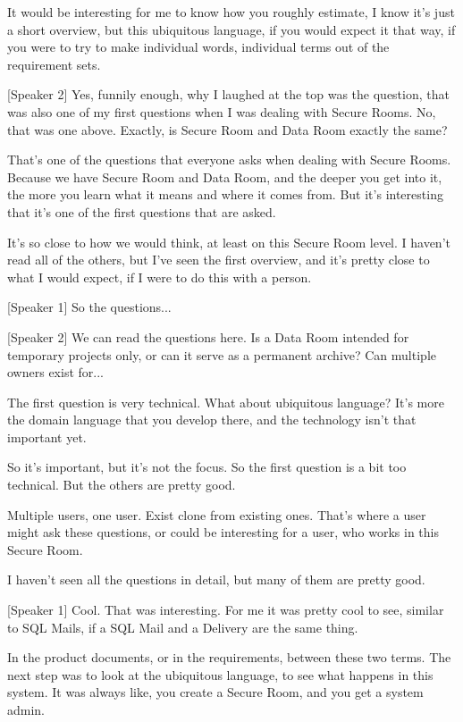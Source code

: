 It would be interesting for me to know how you roughly estimate, I know it's just a short overview, but this ubiquitous language, if you would expect it that way, if you were to try to make individual words, individual terms out of the requirement sets.

[Speaker 2]
Yes, funnily enough, why I laughed at the top was the question, that was also one of my first questions when I was dealing with Secure Rooms. No, that was one above. Exactly, is Secure Room and Data Room exactly the same?

That's one of the questions that everyone asks when dealing with Secure Rooms. Because we have Secure Room and Data Room, and the deeper you get into it, the more you learn what it means and where it comes from. But it's interesting that it's one of the first questions that are asked.

It's so close to how we would think, at least on this Secure Room level. I haven't read all of the others, but I've seen the first overview, and it's pretty close to what I would expect, if I were to do this with a person.

[Speaker 1]
So the questions...

[Speaker 2]
We can read the questions here. Is a Data Room intended for temporary projects only, or can it serve as a permanent archive? Can multiple owners exist for...

The first question is very technical. What about ubiquitous language? It's more the domain language that you develop there, and the technology isn't that important yet.

So it's important, but it's not the focus. So the first question is a bit too technical. But the others are pretty good.

Multiple users, one user. Exist clone from existing ones. That's where a user might ask these questions, or could be interesting for a user, who works in this Secure Room.

I haven't seen all the questions in detail, but many of them are pretty good.

[Speaker 1]
Cool. That was interesting. For me it was pretty cool to see, similar to SQL Mails, if a SQL Mail and a Delivery are the same thing.

In the product documents, or in the requirements, between these two terms. The next step was to look at the ubiquitous language, to see what happens in this system. It was always like, you create a Secure Room, and you get a system admin.

